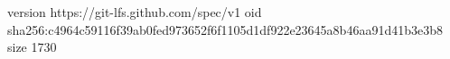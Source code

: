 version https://git-lfs.github.com/spec/v1
oid sha256:c4964c59116f39ab0fed973652f6f1105d1df922e23645a8b46aa91d41b3e3b8
size 1730
